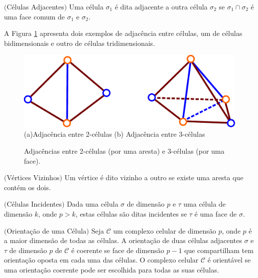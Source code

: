\begin{defi} $($Células Adjacentes$)$
Uma célula $\sigma_1$ é dita adjacente a outra célula $\sigma_2$ se $\sigma_1 \cap \sigma_2$ é uma face comum de $\sigma_1$ e $\sigma_2$.
\end{defi}

A Figura \ref{fig.adjacente} apresenta dois exemplos de adjacência entre células, um de células bidimensionais e outro de células tridimensionais.

\begin{figure}[h]
\begin{center} 
\includegraphics[angle=0,scale=0.3]{imagens/cap2/fig2.eps} \\
(a)Adjacência entre 2-células \hspace{1.cm} (b) Adjacência entre 3-células
\caption{Adjacências entre 2-células (por uma aresta) e 3-células (por uma face).} 
\label{fig.adjacente}
\end{center}
\end{figure}

\begin{defi} $($Vértices Vizinhos$)$
Um vértice é dito vizinho a outro se existe uma aresta que contém os dois.
\end{defi}

\begin{defi} $($Células Incidentes$)$
Dada uma célula $\sigma$ de dimensão $p$ e $\tau$ uma célula de dimensão $k$, onde $p > k$, estas células são ditas incidentes se $\tau$ é uma face de $\sigma$. 
\end{defi}

\begin{defi} $($Orientação de uma Célula$)$
Seja $\mathcal{C}$ um complexo celular de dimensão $p$, onde $p$ é a maior dimensão de todas as células. A orientação de duas células adjacentes $\sigma$ e $\tau$ de dimensão $p$ de $\mathcal{C}$ é coerente se face de dimensão $p-1$ que compartilham tem orientação oposta em cada uma das células. O complexo celular $\mathcal{C}$ é orientável se uma orientação coerente pode ser escolhida para todas as suas células.
\end{defi}


